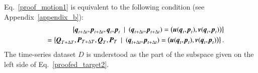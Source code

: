 \documentclass[preprint,
bibnotes,
 amsmath,amssymb,
 aps,
]{revtex4-1}
\newcounter{num}
\begin{document}
Eq.~\eqref{proof_motion1} is equivalent to the following condition (see Appendix~\ref{appendix_b}):
\begin{eqnarray}
&\:&
\left\{\textit{\textbf{q}}_{t+\Delta t},\textit{\textbf{p}}_{t+\Delta t},\textit{\textbf{q}}_{t},\textit{\textbf{p}}_{t}\:\mid \: (\textit{\textbf{q}}_{t+\Delta t},\textit{\textbf{p}}_{t+\Delta t}) = \left(\textit{\textbf{u}}(\textit{\textbf{q}}_{t},\textit{\textbf{p}}_{t}),\textit{\textbf{v}}(\textit{\textbf{q}}_{t},\textit{\textbf{p}}_{t})\right)\right\}\nonumber\\
&\:&\:= \left\{\textit{\textbf{Q}}_{T+\Delta T},\textit{\textbf{P}}_{T+\Delta T},\textit{\textbf{Q}}_{T},\textit{\textbf{P}}_{T}\:\mid \: (\textit{\textbf{q}}_{t+\Delta t},\textit{\textbf{p}}_{t+\Delta t}) = \left(\textit{\textbf{u}}(\textit{\textbf{q}}_{t},\textit{\textbf{p}}_{t}),\textit{\textbf{v}}(\textit{\textbf{q}}_{t},\textit{\textbf{p}}_{t})\right)\right\}.
\label{proofed_target2}
\end{eqnarray}
The time-series dataset $D$ is understood as the part of the subspace given on the left side of Eq.~\eqref{proofed_target2}.
\par
\end{document}
